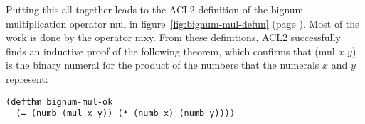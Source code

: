 Putting this all together leads to the ACL2 definition
of the bignum multiplication operator \textsf{mul} in
figure~\ref{fig:bignum-mul-defun} (page \pageref{fig:bignum-mul-defun}).
Most of the work is done by the operator \textsf{mxy}.
From these definitions, ACL2 successfully finds an
inductive proof of the following theorem,
which confirms that \textsf{(mul $x$ $y$)} is the binary numeral
for the product of the numbers that the numerals $x$ and $y$ represent:

\label{bignum-mul-thm}
\begin{code}
\begin{verbatim}
(defthm bignum-mul-ok
  (= (numb (mul x y)) (* (numb x) (numb y))))
\end{verbatim}
\end{code}

\begin{exercises}
\end{exercises}


